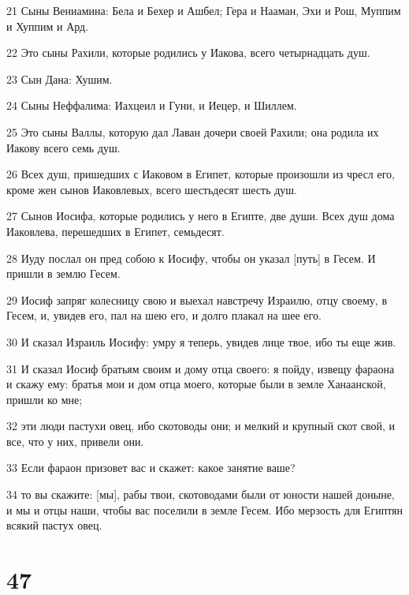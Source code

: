 \par 21 Сыны Вениамина: Бела и Бехер и Ашбел; Гера и Нааман, Эхи и Рош, Муппим и Хуппим и Ард.
\par 22 Это сыны Рахили, которые родились у Иакова, всего четырнадцать душ.
\par 23 Сын Дана: Хушим.
\par 24 Сыны Неффалима: Иахцеил и Гуни, и Иецер, и Шиллем.
\par 25 Это сыны Валлы, которую дал Лаван дочери своей Рахили; она родила их Иакову всего семь душ.
\par 26 Всех душ, пришедших с Иаковом в Египет, которые произошли из чресл его, кроме жен сынов Иаковлевых, всего шестьдесят шесть душ.
\par 27 Сынов Иосифа, которые родились у него в Египте, две души. Всех душ дома Иаковлева, перешедших в Египет, семьдесят.
\par 28 Иуду послал он пред собою к Иосифу, чтобы он указал [путь] в Гесем. И пришли в землю Гесем.
\par 29 Иосиф запряг колесницу свою и выехал навстречу Израилю, отцу своему, в Гесем, и, увидев его, пал на шею его, и долго плакал на шее его.
\par 30 И сказал Израиль Иосифу: умру я теперь, увидев лице твое, ибо ты еще жив.
\par 31 И сказал Иосиф братьям своим и дому отца своего: я пойду, извещу фараона и скажу ему: братья мои и дом отца моего, которые были в земле Ханаанской, пришли ко мне;
\par 32 эти люди пастухи овец, ибо скотоводы они; и мелкий и крупный скот свой, и все, что у них, привели они.
\par 33 Если фараон призовет вас и скажет: какое занятие ваше?
\par 34 то вы скажите: [мы], рабы твои, скотоводами были от юности нашей доныне, и мы и отцы наши, чтобы вас поселили в земле Гесем. Ибо мерзость для Египтян всякий пастух овец.

\chapter{47}

